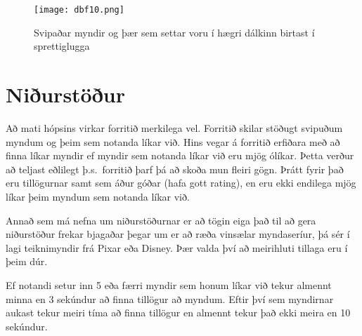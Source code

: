 \documentclass[12pt, git, final]{rureport}
\begin{document}
\begin{figure}
	\centering 
	\texttt{[image: dbf10.png]}
	\caption{Svipaðar myndir og þær sem settar voru í hægri dálkinn birtast í sprettiglugga\label{fig:dbf10}}
\end{figure}
\pagebreak
\section{Niðurstöður}
Að mati hópsins virkar forritið merkilega vel. Forritið skilar stöðugt svipuðum myndum og þeim sem notanda líkar við. Hins vegar á forritið erfiðara með að finna líkar myndir ef myndir sem notanda líkar við eru mjög ólíkar. Þetta verður að teljast eðlilegt þ.s.~forritið þarf þá að skoða mun fleiri gögn. Þrátt fyrir það eru tillögurnar samt sem áður góðar (hafa gott rating), en eru ekki endilega mjög líkar þeim myndum sem notanda líkar við.

Annað sem má nefna um niðurstöðurnar er að tögin eiga það til að gera niðurstöður frekar bjagaðar þegar um er að ræða vinsælar myndaseríur, þá sér í lagi teiknimyndir frá Pixar eða Disney. Þær valda því að meirihluti tillaga eru í þeim dúr.

Ef notandi setur inn 5 eða færri myndir sem honum líkar við tekur almennt minna en 3 sekúndur að finna tillögur að myndum. Eftir því sem myndirnar aukast tekur meiri tíma að finna tillögur en almennt tekur það ekki meira en 10 sekúndur.
\end{document}
